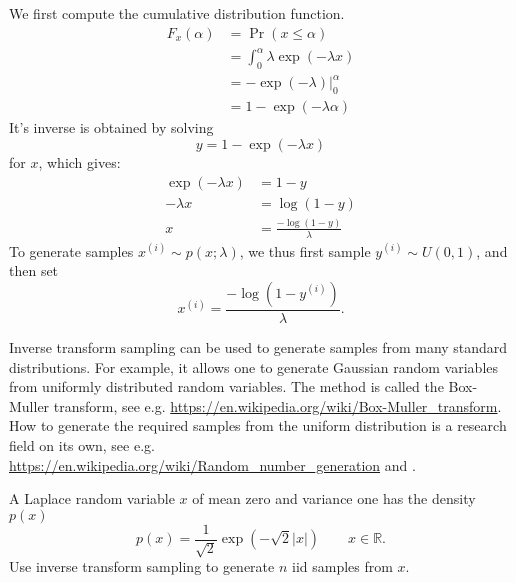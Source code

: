 \begin{solution}
  We first compute the cumulative distribution function.
  \begin{align}
    F_x(\alpha) & = \Pr(x\le \alpha)\\
    & = \int_0^\alpha  \lambda \exp(-\lambda x)\\
    & = -\exp(-\lambda)\big|_0^\alpha\\
    & = 1-\exp(-\lambda \alpha)
  \end{align}
  It's inverse is obtained by solving
  \begin{equation}
    y = 1-\exp(-\lambda x)
  \end{equation}
  for $x$, which gives:
  \begin{align}
    \exp(-\lambda x) &= 1-y\\
    -\lambda x &= \log(1-y)\\
    x &= \frac{-\log(1-y)}{\lambda}
  \end{align}
  To generate samples $x^{(i)}  \sim p(x; \lambda)$, we thus first sample $y^{(i)} \sim U(0,1)$, and then set
  \begin{equation}
    x^{(i)} = \frac{-\log(1-y^{(i)})}{\lambda}.
  \end{equation}
 
  Inverse transform sampling can be used to generate samples
  from many standard distributions. For example, it allows one
  to generate Gaussian random variables from uniformly
  distributed random variables. The method is called the
  Box-Muller transform, see
  e.g. \url{https://en.wikipedia.org/wiki/Box-Muller_transform}. How
  to generate the required samples from the uniform distribution is a
  research field on its own, see
  e.g. \url{https://en.wikipedia.org/wiki/Random_number_generation}
  and \citep[Chapter 3]{Owen2013}.

\end{solution}
  

\label{ex:sampling-from-a-Laplace-distribution}
A Laplace random variable $x$ of mean zero and variance one has the density $p(x)$
\begin{equation}
  p(x) = \frac{1}{\sqrt{2}} \exp\left(-\sqrt{2}|x|\right) \quad \quad x \in \mathbb{R}.  
\end{equation}
Use inverse transform sampling to generate $n$ iid samples from $x$.

